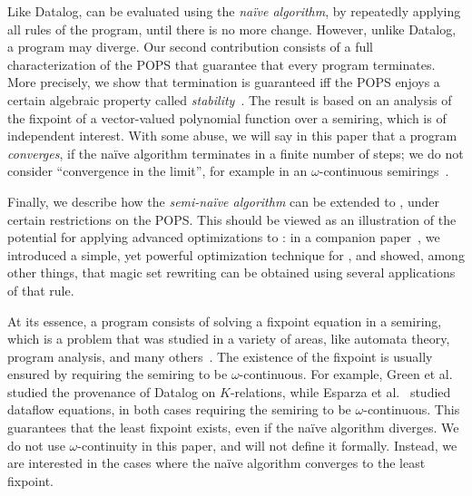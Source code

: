 Like Datalog, \datalogo can be evaluated using the {\em na\"ive algorithm},
by repeatedly applying all rules of the program, until there is no
more change.  However, unlike Datalog, a \datalogo program may diverge.
Our second contribution consists of a full characterization of the
POPS that guarantee that every \datalogo program terminates.  More
precisely, we show that termination is guaranteed iff the POPS enjoys
a certain algebraic property called {\em
  stability}~\cite{semiring_book}.  The result is based on an analysis
of the fixpoint of a vector-valued polynomial function over a semiring, which is of
independent interest.  With some abuse, we will say in this paper that
a \datalogo program {\em converges}, if the na\"ive algorithm terminates
in a finite number of steps; we do not consider ``convergence in the
limit'', for example in an $\omega$-continuous
semirings~\cite{DBLP:conf/pods/GreenKT07,DBLP:journals/jacm/EsparzaKL10}.

Finally, we describe how the {\em semi-na\"ive algorithm} can be
extended to \datalogo, under certain restrictions on the POPS.  This
should be viewed as an illustration of the potential for applying
advanced optimizations to \datalogo: in a companion
paper~\cite{DBLP:conf/sigmod/WangK0PS22}, we introduced a simple, yet
powerful optimization technique for \datalogo, and showed, among other
things, that magic set rewriting can be obtained using several
applications of that rule.

At its essence, a \datalogo program consists of solving a fixpoint
equation in a semiring, which is a problem that was studied in a variety
of areas, like automata theory, program analysis, and many
others~\cite{MR1470001,DBLP:conf/popl/CousotC77,MR1728440,MR1059930,
  DBLP:conf/lics/HopkinsK99, DBLP:journals/tcs/Lehmann77,
  semiring_book,MR609751}.  The existence of the fixpoint is usually
ensured by requiring the semiring to be $\omega$-continuous. For
example, Green et al.~\cite{DBLP:conf/pods/GreenKT07} studied the
provenance of Datalog on $K$-relations, while Esparza et
al.~\cite{DBLP:journals/jacm/EsparzaKL10} studied dataflow equations,
in both cases requiring the semiring to be $\omega$-continuous.  This
guarantees that the least fixpoint exists, even if the na\"ive algorithm
diverges.
We do not use $\omega$-continuity in this paper,
 and will not define it formally.
Instead, we are interested in the cases 
 where the na\"ive algorithm converges to the least fixpoint.

